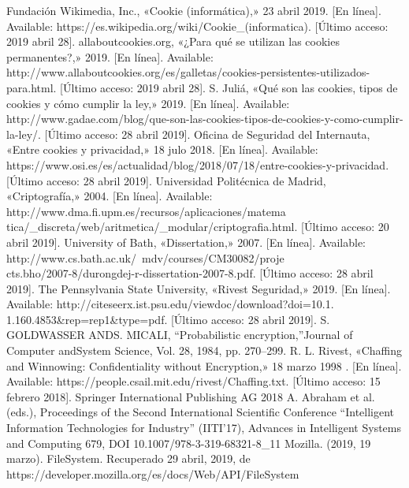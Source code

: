 \documentclass[12pt, a4paper, titlepage]{report}
\begin{document}
\begin{thebibliography}{20}
		Fundación Wikimedia, Inc., «Cookie (informática),» 23 abril 2019. [En línea]. Available: https://es.wikipedia.org/wiki/Cookie\_(informatica). [Último acceso: 2019 abril 28].
    	allaboutcookies.org, «¿Para qué se utilizan las cookies permanentes?,» 2019. [En línea]. Available: http://www.allaboutcookies.org/es/galletas/cookies-persistentes-utilizados-para.html. [Último acceso: 2019 abril 28].
		S. Juliá, «Qué son las cookies, tipos de cookies y cómo cumplir la ley,» 2019. [En línea]. Available: http://www.gadae.com/blog/que-son-las-cookies-tipos-de-cookies-y-como-cumplir-la-ley/. [Último acceso: 28 abril 2019].
		Oficina de Seguridad del Internauta, «Entre cookies y privacidad,» 18 julo 2018. [En línea]. Available: https://www.osi.es/es/actualidad/blog/2018/07/18/entre-cookies-y-privacidad. [Último acceso: 28 abril 2019].
	    Universidad Politécnica de Madrid, «Criptografía,» 2004. [En línea]. Available: http://www.dma.fi.upm.es/recursos/aplicaciones/matema\\tica/\_discreta/web/aritmetica/\_modular/criptografia.html. [Último acceso: 20 abril 2019].
    	University of Bath, «Dissertation,» 2007. [En línea]. Available: http://www.cs.bath.ac.uk/~mdv/courses/CM30082/proje\\cts.bho/2007-8/durongdej-r-dissertation-2007-8.pdf. [Último acceso: 28 abril 2019].
		The Pennsylvania State University, «Rivest Seguridad,» 2019. [En línea]. Available: http://citeseerx.ist.psu.edu/viewdoc/download?doi=10.1.\\1.160.4853\&rep=rep1\&type=pdf. [Último acceso: 28 abril 2019].
		S.  GOLDWASSER  ANDS. MICALI, “Probabilistic encryption,”Journal  of Computer andSystem Science, Vol. 28, 1984, pp. 270–299.
		R. L. Rivest, «Chaffing and Winnowing: Confidentiality without Encryption,» 18 marzo 1998 . [En línea]. Available: https://people.csail.mit.edu/rivest/Chaffing.txt. [Último acceso: 15 febrero 2018].
		Springer International Publishing AG 2018
        A. Abraham et al. (eds.), Proceedings of the Second International
        Scientific Conference “Intelligent Information Technologies for Industry” (IITI’17),
        Advances in Intelligent Systems and Computing 679, DOI 10.1007/978-3-319-68321-8\_11
        Mozilla. (2019, 19 marzo). FileSystem. Recuperado 29 abril, 2019, de https://developer.mozilla.org/es/docs/Web/API/FileSystem

\end{thebibliography}
\end{document}
